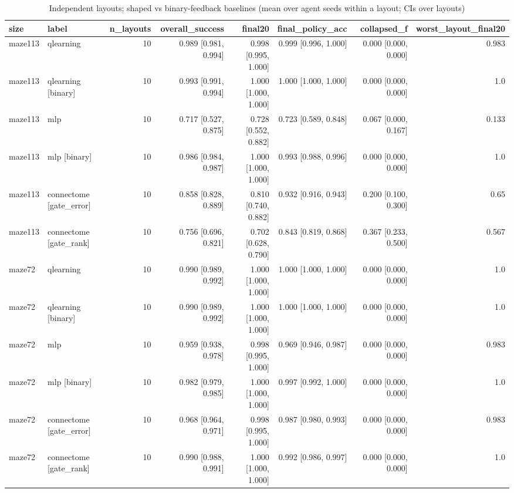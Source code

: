 \begin{table}[t]
\centering
\small
\begin{tabular}{llrrrrrr}
\toprule
size & label & n\_layouts & overall\_success & final20 & final\_policy\_acc & collapsed\_f & worst\_layout\_final20 \\
\midrule
maze113 & qlearning & 10 & 0.989 [0.981, 0.994] & 0.998 [0.995, 1.000] & 0.999 [0.996, 1.000] & 0.000 [0.000, 0.000] & 0.983 \\
maze113 & qlearning [binary] & 10 & 0.993 [0.991, 0.994] & 1.000 [1.000, 1.000] & 1.000 [1.000, 1.000] & 0.000 [0.000, 0.000] & 1.0 \\
maze113 & mlp & 10 & 0.717 [0.527, 0.875] & 0.728 [0.552, 0.882] & 0.723 [0.589, 0.848] & 0.067 [0.000, 0.167] & 0.133 \\
maze113 & mlp [binary] & 10 & 0.986 [0.984, 0.987] & 1.000 [1.000, 1.000] & 0.993 [0.988, 0.996] & 0.000 [0.000, 0.000] & 1.0 \\
maze113 & connectome [gate\_error] & 10 & 0.858 [0.828, 0.889] & 0.810 [0.740, 0.882] & 0.932 [0.916, 0.943] & 0.200 [0.100, 0.300] & 0.65 \\
maze113 & connectome [gate\_rank] & 10 & 0.756 [0.696, 0.821] & 0.702 [0.628, 0.790] & 0.843 [0.819, 0.868] & 0.367 [0.233, 0.500] & 0.567 \\
maze72 & qlearning & 10 & 0.990 [0.989, 0.992] & 1.000 [1.000, 1.000] & 1.000 [1.000, 1.000] & 0.000 [0.000, 0.000] & 1.0 \\
maze72 & qlearning [binary] & 10 & 0.990 [0.989, 0.992] & 1.000 [1.000, 1.000] & 1.000 [1.000, 1.000] & 0.000 [0.000, 0.000] & 1.0 \\
maze72 & mlp & 10 & 0.959 [0.938, 0.978] & 0.998 [0.995, 1.000] & 0.969 [0.946, 0.987] & 0.000 [0.000, 0.000] & 0.983 \\
maze72 & mlp [binary] & 10 & 0.982 [0.979, 0.985] & 1.000 [1.000, 1.000] & 0.997 [0.992, 1.000] & 0.000 [0.000, 0.000] & 1.0 \\
maze72 & connectome [gate\_error] & 10 & 0.968 [0.964, 0.971] & 0.998 [0.995, 1.000] & 0.987 [0.980, 0.993] & 0.000 [0.000, 0.000] & 0.983 \\
maze72 & connectome [gate\_rank] & 10 & 0.990 [0.988, 0.991] & 1.000 [1.000, 1.000] & 0.992 [0.986, 0.997] & 0.000 [0.000, 0.000] & 1.0 \\
\bottomrule
\end{tabular}
\caption{Independent layouts; shaped vs binary-feedback baselines (mean over agent seeds within a layout; CIs over layouts)}
\label{tab:layouts_binary_summary}
\end{table}